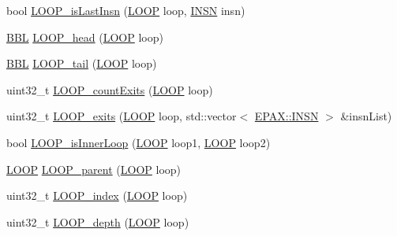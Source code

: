 \begin{DoxyCompactItemize}
bool \hyperlink{namespace_e_p_a_x_a2548faca0cd72cd585cf39b0c32262b5}{\-L\-O\-O\-P\-\_\-is\-Last\-Insn} (\hyperlink{namespace_e_p_a_x_ac236645423e99e8ccc784040ff1f881e}{\-L\-O\-O\-P} loop, \hyperlink{namespace_e_p_a_x_a601da5f2ead9a877d566da6cfc9026eb}{\-I\-N\-S\-N} insn)
\item 
\hyperlink{namespace_e_p_a_x_a0ad4f6573b03fa5c375bed0e68d4fab0}{\-B\-B\-L} \hyperlink{namespace_e_p_a_x_ae8b4e880feb5c2176e80f080d6ef8a9b}{\-L\-O\-O\-P\-\_\-head} (\hyperlink{namespace_e_p_a_x_ac236645423e99e8ccc784040ff1f881e}{\-L\-O\-O\-P} loop)
\item 
\hyperlink{namespace_e_p_a_x_a0ad4f6573b03fa5c375bed0e68d4fab0}{\-B\-B\-L} \hyperlink{namespace_e_p_a_x_a51a87aa43f27e1c634c9515f6fd510fb}{\-L\-O\-O\-P\-\_\-tail} (\hyperlink{namespace_e_p_a_x_ac236645423e99e8ccc784040ff1f881e}{\-L\-O\-O\-P} loop)
\item 
uint32\-\_\-t \hyperlink{namespace_e_p_a_x_aae01d41cf0c4f34ac24db95e0efd4df3}{\-L\-O\-O\-P\-\_\-count\-Exits} (\hyperlink{namespace_e_p_a_x_ac236645423e99e8ccc784040ff1f881e}{\-L\-O\-O\-P} loop)
\item 
uint32\-\_\-t \hyperlink{namespace_e_p_a_x_a155b2e53ab6fe3ad6b78b028b773b171}{\-L\-O\-O\-P\-\_\-exits} (\hyperlink{namespace_e_p_a_x_ac236645423e99e8ccc784040ff1f881e}{\-L\-O\-O\-P} loop, std\-::vector$<$ \hyperlink{namespace_e_p_a_x_a601da5f2ead9a877d566da6cfc9026eb}{\-E\-P\-A\-X\-::\-I\-N\-S\-N} $>$ \&insn\-List)
\item 
bool \hyperlink{namespace_e_p_a_x_adcf5a5412d67c5a3a4ae4aa3c8aa1498}{\-L\-O\-O\-P\-\_\-is\-Inner\-Loop} (\hyperlink{namespace_e_p_a_x_ac236645423e99e8ccc784040ff1f881e}{\-L\-O\-O\-P} loop1, \hyperlink{namespace_e_p_a_x_ac236645423e99e8ccc784040ff1f881e}{\-L\-O\-O\-P} loop2)
\item 
\hyperlink{namespace_e_p_a_x_ac236645423e99e8ccc784040ff1f881e}{\-L\-O\-O\-P} \hyperlink{namespace_e_p_a_x_ae59c1fe1b7a28c2f8c73593999c3eb77}{\-L\-O\-O\-P\-\_\-parent} (\hyperlink{namespace_e_p_a_x_ac236645423e99e8ccc784040ff1f881e}{\-L\-O\-O\-P} loop)
\item 
uint32\-\_\-t \hyperlink{namespace_e_p_a_x_ab4763dab5b758823eea993ec7b9c6f40}{\-L\-O\-O\-P\-\_\-index} (\hyperlink{namespace_e_p_a_x_ac236645423e99e8ccc784040ff1f881e}{\-L\-O\-O\-P} loop)
\item 
uint32\-\_\-t \hyperlink{namespace_e_p_a_x_a97473ca1f7ba4b714fb78e4bd024c5f2}{\-L\-O\-O\-P\-\_\-depth} (\hyperlink{namespace_e_p_a_x_ac236645423e99e8ccc784040ff1f881e}{\-L\-O\-O\-P} loop)
\item 

\end{DoxyCompactItemize}
